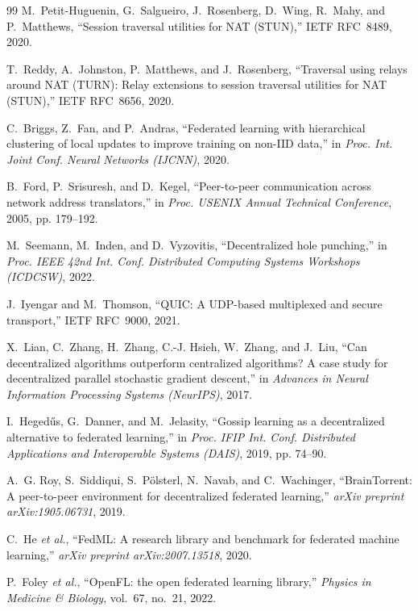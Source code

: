 ﻿\documentclass[journal]{IEEEtran}
\begin{document}
\begin{thebibliography}{99}
M.~Petit-Huguenin, G.~Salgueiro, J.~Rosenberg, D.~Wing, R.~Mahy, and P.~Matthews,
``Session traversal utilities for NAT (STUN),''
IETF RFC~8489, 2020.

T.~Reddy, A.~Johnston, P.~Matthews, and J.~Rosenberg,
``Traversal using relays around NAT (TURN): Relay extensions to session traversal utilities for NAT (STUN),''
IETF RFC~8656, 2020.

C.~Briggs, Z.~Fan, and P.~Andras,
``Federated learning with hierarchical clustering of local updates to improve training on non-IID data,''
in \emph{Proc. Int. Joint Conf. Neural Networks (IJCNN)}, 2020.

B.~Ford, P.~Srisuresh, and D.~Kegel,
``Peer-to-peer communication across network address translators,''
in \emph{Proc. USENIX Annual Technical Conference}, 2005, pp. 179--192.

M.~Seemann, M.~Inden, and D.~Vyzovitis,
``Decentralized hole punching,''
in \emph{Proc. IEEE 42nd Int. Conf. Distributed Computing Systems Workshops (ICDCSW)}, 2022.

J.~Iyengar and M.~Thomson,
``QUIC: A UDP-based multiplexed and secure transport,''
IETF RFC~9000, 2021.

X.~Lian, C.~Zhang, H.~Zhang, C.-J. Hsieh, W.~Zhang, and J.~Liu,
``Can decentralized algorithms outperform centralized algorithms? A case study for decentralized parallel stochastic gradient descent,''
in \emph{Advances in Neural Information Processing Systems (NeurIPS)}, 2017.

I.~Heged\H{u}s, G.~Danner, and M.~Jelasity,
``Gossip learning as a decentralized alternative to federated learning,''
in \emph{Proc. IFIP Int. Conf. Distributed Applications and Interoperable Systems (DAIS)}, 2019, pp. 74--90.

A.~G. Roy, S.~Siddiqui, S.~P\"olsterl, N.~Navab, and C.~Wachinger,
``BrainTorrent: A peer-to-peer environment for decentralized federated learning,''
\emph{arXiv preprint arXiv:1905.06731}, 2019.

C.~He \emph{et al.},
``FedML: A research library and benchmark for federated machine learning,''
\emph{arXiv preprint arXiv:2007.13518}, 2020.

P.~Foley \emph{et al.},
``OpenFL: the open federated learning library,''
\emph{Physics in Medicine \& Biology}, vol.~67, no.~21, 2022.


\end{thebibliography}
\end{document}
